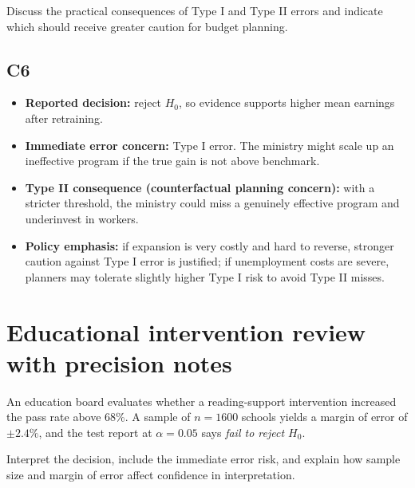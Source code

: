 	Discuss the practical consequences of Type I and Type II errors and indicate which should receive greater caution for budget planning.
	
	\begin{center}
	\end{center}
	
	\subsection*{C6}
	\begin{itemize}
		\item \textbf{Reported decision:} reject \(H_0\), so evidence supports higher mean earnings after retraining.
		\item \textbf{Immediate error concern:} Type I error. The ministry might scale up an ineffective program if the true gain is not above benchmark.
		\item \textbf{Type II consequence (counterfactual planning concern):} with a stricter threshold, the ministry could miss a genuinely effective program and underinvest in workers.
		\item \textbf{Policy emphasis:} if expansion is very costly and hard to reverse, stronger caution against Type I error is justified; if unemployment costs are severe, planners may tolerate slightly higher Type I risk to avoid Type II misses.
	\end{itemize}
	
	\section{Educational intervention review with precision notes}
	An education board evaluates whether a reading-support intervention increased the pass rate above 68\%. A sample of \(n=1600\) schools yields a margin of error of \(\pm 2.4\%\), and the test report at \(\alpha=0.05\) says \textit{fail to reject \(H_0\)}.
	
	Interpret the decision, include the immediate error risk, and explain how sample size and margin of error affect confidence in interpretation.
	
	\begin{center}
	\end{center}
	
